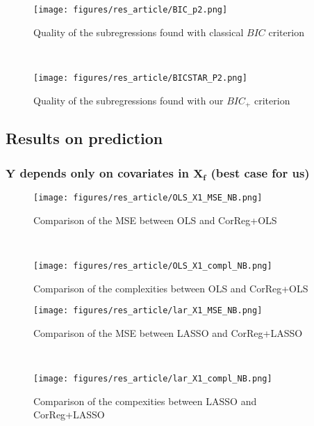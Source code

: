\documentclass[12pt,a4paper]{report}
\begin{document}
\begin{figure}[h!]
	\begin{minipage}[l]{.48\linewidth}
			\texttt{[image: figures/res\_article/BIC\_p2.png]} 
			\caption{Quality of the subregressions found with classical $BIC$ criterion}
	\end{minipage} \
   \begin{minipage}[r]{.48\linewidth}
			\texttt{[image: figures/res\_article/BICSTAR\_P2.png]} 
			\caption{Quality of the subregressions found with our $BIC_+$ criterion} 
   \end{minipage}
\end{figure}






\clearpage
\subsection{Results on prediction}\label{compY}

\subsubsection{$\boldsymbol{Y}$ depends only on covariates in $\boldsymbol{X_f}$ (best case for us)}	 \label{tableMSEsimgauche}
\begin{figure}[h!]
	\begin{minipage}[l]{.48\linewidth}
			\texttt{[image: figures/res\_article/OLS\_X1\_MSE\_NB.png]} 
			\caption{Comparison of the MSE between OLS and CorReg+OLS}
	\end{minipage} \
   \begin{minipage}[r]{.48\linewidth}
			\texttt{[image: figures/res\_article/OLS\_X1\_compl\_NB.png]} 
			\caption{Comparison of the complexities between OLS and CorReg+OLS} 
   \end{minipage}
\end{figure}
 

 \begin{figure}[h!]
	\begin{minipage}[l]{.48\linewidth}
			\texttt{[image: figures/res\_article/lar\_X1\_MSE\_NB.png]} 
			\caption{Comparison of the MSE between LASSO and CorReg+LASSO}
	\end{minipage} \
   \begin{minipage}[r]{.48\linewidth}
			\texttt{[image: figures/res\_article/lar\_X1\_compl\_NB.png]} 
			\caption{Comparison of the compexities between LASSO and CorReg+LASSO} 
   \end{minipage}
\end{figure}
\end{document}
